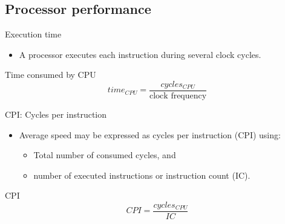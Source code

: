 \subsection{Processor performance}

\begin{frame}[t]{Execution time}
\begin{itemize}
  \item A processor executes each instruction during several clock cycles.
\end{itemize}
\begin{block}{Time consumed by CPU}
\begin{displaymath}
time_{CPU} = 
\frac{cycles_{CPU}}{\text{clock frequency}}
\end{displaymath}
\end{block}
\end{frame}

\begin{frame}[t]{CPI: Cycles per instruction}
  \begin{itemize}
    \item Average speed may be expressed as cycles per instruction (CPI) using:
      \begin{itemize}
         \item Total number of consumed cycles, and
         \item number of executed instructions or instruction count (IC).
      \end{itemize}
  \end{itemize}
\begin{block}{CPI}
\begin{displaymath}
CPI =
\frac{cycles_{CPU}}{IC}
\end{displaymath}
\end{block}
\end{frame}

